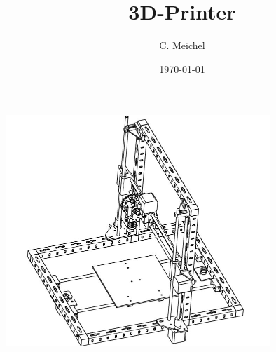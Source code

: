 \documentclass[a4paper,12pt]{article}%
\author{C. Meichel}%
\title{3D-Printer}%
\date{\today}%
\begin{document}
%
%
%
%
%
%
%
%
\maketitle%
\includegraphics[width=10cm]{img/printer.jpg}%
\clearpage%
\tableofcontents%
\clearpage%
%
%
%
%
%
\clearpage%
\listoffigures%
%
\end{document}
